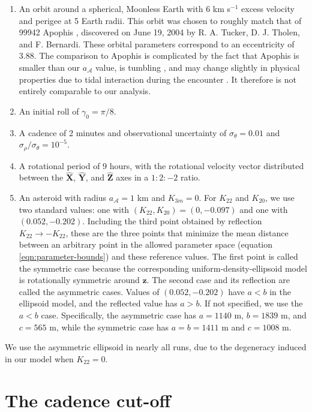 \documentclass[fleqn,usenatbib]{mnras}
\newcommand{\unit}[1]{\bm{\hat{#1}}}
\begin{document}
\begin{enumerate}
  \item An orbit around a spherical, Moonless Earth with $6$ km s$^{-1}$ excess velocity and perigee at 5 Earth radii. This orbit was chosen to roughly match that of 99942 Apophis \cite{giorgini2005recent, giorgini2008predicting, smalley20052004}, discovered on June 19, 2004 by R. A. Tucker, D. J. Tholen, and F. Bernardi. These orbital parameters correspond to an eccentricity of 3.88. The comparison to Apophis is complicated by the fact that Apophis is smaller than our $a_\mathcal{A}$ value, is tumbling \cite{PRAVEC201448}, and may change slightly in physical properties due to tidal interaction during the encounter \cite{yu2014numerical,hirabayashi2021finite}. It therefore is not entirely comparable to our analysis. 
  \item An initial roll of $\gamma_0=\pi/8$.
  \item A cadence of 2 minutes and observational uncertainty of $\sigma_\theta = 0.01$ and $\sigma_\rho / \sigma_\theta = 10^{-5}$.
  \item A rotational period of 9 hours, with the rotational velocity vector distributed between the $\unit X$, $\unit Y$, and $\unit Z$ axes in a $1:2:-2$ ratio.
  \item An asteroid with radius $a_\mathcal{A} = 1$ km and $K_{3m}=0$. For $K_{22}$ and $K_{20}$, we use two standard values: one with $(K_{22}, K_{20}) = (0, -0.097)$ and one with $(0.052, -0.202)$. Including the third point obtained by reflection $K_{22}\rightarrow -K_{22}$, these are the three points that minimize the mean distance between an arbitrary point in the allowed parameter space (equation \ref{eqn:parameter-bounds}) and these reference values. The first point is called the symmetric case because the corresponding uniform-density-ellipsoid model is rotationally symmetric around $\unit z$. The second case and its reflection are called the asymmetric cases. Values of $(0.052, -0.202)$ have $a < b$ in the ellipsoid model, and the reflected value has $a > b$. If not specified, we use the $a < b$ case. Specifically, the asymmetric case has $a=1140$ m, $b=1839$ m, and $c=565$ m, while the symmetric case has $a=b=1411$ m and $c=1008$ m.
\end{enumerate}

We use the asymmetric ellipsoid in nearly all runs, due to the degeneracy induced in our model when $K_{22} = 0$.


\section{The cadence cut-off}
\label{app:cadence-tests}
\end{document}
